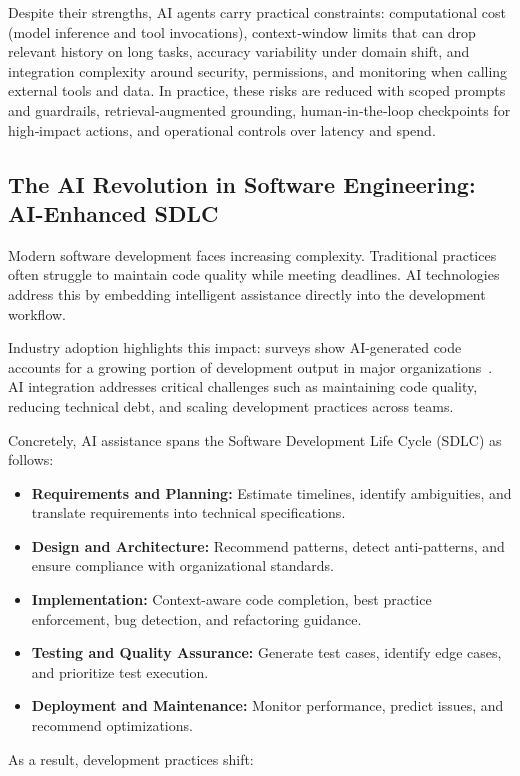 \begin{spacing}{1.2}
Despite their strengths, AI agents carry practical constraints: computational cost (model inference and tool invocations), context‑window limits that can drop relevant history on long tasks, accuracy variability under domain shift, and integration complexity around security, permissions, and monitoring when calling external tools and data. In practice, these risks are reduced with scoped prompts and guardrails, retrieval‑augmented grounding, human‑in‑the‑loop checkpoints for high‑impact actions, and operational controls over latency and spend.

\subsection{The AI Revolution in Software Engineering: AI-Enhanced SDLC}
Modern software development faces increasing complexity. Traditional practices often struggle to maintain code quality while meeting deadlines. AI technologies address this by embedding intelligent assistance directly into the development workflow.

Industry adoption highlights this impact: surveys show AI-generated code accounts for a growing portion of development output in major organizations~\cite{google2024ai_code, google2024developer_survey}. AI integration addresses critical challenges such as maintaining code quality, reducing technical debt, and scaling development practices across teams.

Concretely, AI assistance spans the Software Development Life Cycle (SDLC) as follows:

\begin{itemize}
\item \textbf{Requirements and Planning:} Estimate timelines, identify ambiguities, and translate requirements into technical specifications.
\item \textbf{Design and Architecture:} Recommend patterns, detect anti-patterns, and ensure compliance with organizational standards.
\item \textbf{Implementation:} Context-aware code completion, best practice enforcement, bug detection, and refactoring guidance.
\item \textbf{Testing and Quality Assurance:} Generate test cases, identify edge cases, and prioritize test execution.
\item \textbf{Deployment and Maintenance:} Monitor performance, predict issues, and recommend optimizations.
\end{itemize}
As a result, development practices shift:


\end{spacing}

